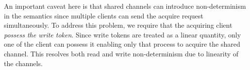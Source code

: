 
An important caveat here is that shared channels can introduce non-determinism
in the semantics since multiple clients can send the acquire request simultaneously.
To address this problem, we require that the acquiring client \emph{possess
the write token}.
Since write tokens are treated as a linear quantity, only one of the client can
possess it enabling only that process to acquire the shared channel.
This resolves both read and write non-determinism due to linearity of the channels.

